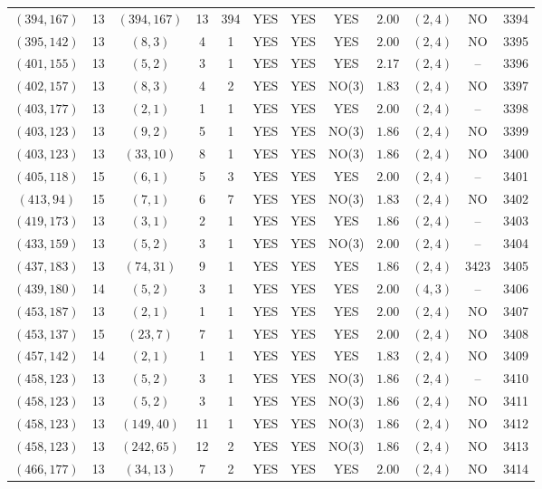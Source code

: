 \begin{longtable}{|c|c|c|c|c|c|c|c|c|c|c|c|}
$(394,167)$ & 13 & $(394,167)$ & 13 & 394 & YES & YES & YES & $2.00$ & $(2,4)$ & NO & 3394\\
$(395,142)$ & 13 & $(8,3)$ & 4 & 1 & YES & YES & YES & $2.00$ & $(2,4)$ & NO & 3395\\
$(401,155)$ & 13 & $(5,2)$ & 3 & 1 & YES & YES & YES & $2.17$ & $(2,4)$ & -- & 3396\\
$(402,157)$ & 13 & $(8,3)$ & 4 & 2 & YES & YES & NO(3) & $1.83$ & $(2,4)$ & NO & 3397\\
$(403,177)$ & 13 & $(2,1)$ & 1 & 1 & YES & YES & YES & $2.00$ & $(2,4)$ & -- & 3398\\
$(403,123)$ & 13 & $(9,2)$ & 5 & 1 & YES & YES & NO(3) & $1.86$ & $(2,4)$ & NO & 3399\\
$(403,123)$ & 13 & $(33,10)$ & 8 & 1 & YES & YES & NO(3) & $1.86$ & $(2,4)$ & NO & 3400\\
$(405,118)$ & 15 & $(6,1)$ & 5 & 3 & YES & YES & YES & $2.00$ & $(2,4)$ & -- & 3401\\
$(413,94)$ & 15 & $(7,1)$ & 6 & 7 & YES & YES & NO(3) & $1.83$ & $(2,4)$ & NO & 3402\\
$(419,173)$ & 13 & $(3,1)$ & 2 & 1 & YES & YES & YES & $1.86$ & $(2,4)$ & -- & 3403\\
$(433,159)$ & 13 & $(5,2)$ & 3 & 1 & YES & YES & NO(3) & $2.00$ & $(2,4)$ & -- & 3404\\
$(437,183)$ & 13 & $(74,31)$ & 9 & 1 & YES & YES & YES & $1.86$ & $(2,4)$ & 3423 & 3405\\
$(439,180)$ & 14 & $(5,2)$ & 3 & 1 & YES & YES & YES & $2.00$ & $(4,3)$ & -- & 3406\\
$(453,187)$ & 13 & $(2,1)$ & 1 & 1 & YES & YES & YES & $2.00$ & $(2,4)$ & NO & 3407\\
$(453,137)$ & 15 & $(23,7)$ & 7 & 1 & YES & YES & YES & $2.00$ & $(2,4)$ & NO & 3408\\
$(457,142)$ & 14 & $(2,1)$ & 1 & 1 & YES & YES & YES & $1.83$ & $(2,4)$ & NO & 3409\\
$(458,123)$ & 13 & $(5,2)$ & 3 & 1 & YES & YES & NO(3) & $1.86$ & $(2,4)$ & -- & 3410\\
$(458,123)$ & 13 & $(5,2)$ & 3 & 1 & YES & YES & NO(3) & $1.86$ & $(2,4)$ & NO & 3411\\
$(458,123)$ & 13 & $(149,40)$ & 11 & 1 & YES & YES & NO(3) & $1.86$ & $(2,4)$ & NO & 3412\\
$(458,123)$ & 13 & $(242,65)$ & 12 & 2 & YES & YES & NO(3) & $1.86$ & $(2,4)$ & NO & 3413\\
$(466,177)$ & 13 & $(34,13)$ & 7 & 2 & YES & YES & YES & $2.00$ & $(2,4)$ & NO & 3414\\

\end{longtable}
